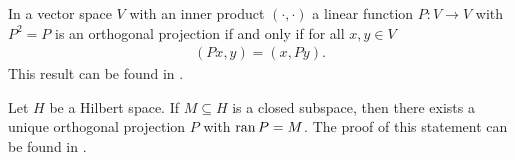 \begin{remark}
	In a vector space $V$ with an inner product $(\cdot, \cdot)$ a linear function $P: V \to V$ with $P^2 = P$ is an orthogonal projection if and only if for all $x,y \in V$
	\begin{align*}
		(Px, y) = (x,Py).
	\end{align*}
	This result can be found in \cite[p. 47]{FAna1}.
\end{remark}


\begin{remark} \label{remark:orth_proj_uniqueness}
	Let $H$ be a Hilbert space. If $M \subseteq H$ is a closed subspace, then there exists a unique orthogonal projection $P$ with $\operatorname{ran} P = M$. The proof of this statement can be found in \cite[p. 48]{FAna1}.
\end{remark}